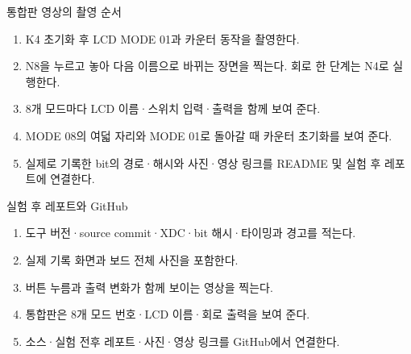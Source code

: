 \begin{frame}{통합판 영상의 촬영 순서}
\small
\begin{enumerate}
\item K4 초기화 후 LCD MODE 01과 카운터 동작을 촬영한다.
\item N8을 누르고 놓아 다음 이름으로 바뀌는 장면을 찍는다. 회로 한 단계는 N4로 실행한다.
\item 8개 모드마다 LCD 이름·스위치 입력·출력을 함께 보여 준다.
\item MODE 08의 여덟 자리와 MODE 01로 돌아갈 때 카운터 초기화를 보여 준다.
\item 실제로 기록한 bit의 경로·해시와 사진·영상 링크를 README 및 실험 후 레포트에 연결한다.
\end{enumerate}
\end{frame}

\begin{frame}{실험 후 레포트와 GitHub}
\small
\begin{enumerate}
\item 도구 버전·source commit·XDC·bit 해시·타이밍과 경고를 적는다.
\item 실제 기록 화면과 보드 전체 사진을 포함한다.
\item 버튼 누름과 출력 변화가 함께 보이는 영상을 찍는다.
\item 통합판은 8개 모드 번호·LCD 이름·회로 출력을 보여 준다.
\item 소스·실험 전후 레포트·사진·영상 링크를 GitHub에서 연결한다.
\end{enumerate}
\end{frame}


